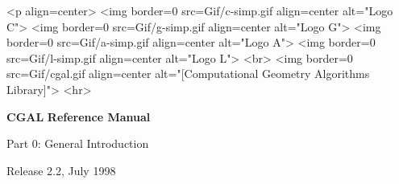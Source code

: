\documentclass{book}
\newcommand{\cgalColumnLayout}{\ccTexHtml{%
    \ccSetThreeColumns{Oriented_side}{}{\hspace*{8.5cm}}
    \ccPropagateThreeToTwoColumns}{}}
\newcommand{\cgalrelease}{2.2}
\begin{document}
\pagestyle{empty}

\begin{titlepage}
\mbox{}
\vskip3cm

\ccTexHtml
{\centerline{
    }}
 {<p align=center>
   <img border=0 src=Gif/c-simp.gif align=center alt="Logo C">
   <img border=0 src=Gif/g-simp.gif align=center alt="Logo G">
   <img border=0 src=Gif/a-simp.gif align=center alt="Logo A">
   <img border=0 src=Gif/l-simp.gif align=center alt="Logo L">
   <br>
   <img border=0 src=Gif/cgal.gif align=center
    alt="[Computational Geometry Algorithms Library]">
    <hr>}

\vskip2cm
\centerline{ {\Huge\bf CGAL} {\huge\bf Reference Manual } }
\vskip1cm
\centerline{ {\huge Part 0: General Introduction} }

\vskip2cm
\newcommand{\mydate}{July 1998}
\ccTexHtml
{\renewcommand{\mydate}{\ifcase\the\month \or January\or
    February\or March\or April\or May\or June\or July\or August\or
    September\or October\or November\or December\fi~\the\year}}{}
  \centerline{ {\large Release \cgalrelease, \mydate} }

\end{titlepage}

\pagestyle{plain}
\setcounter{page}{0}


\cleardoublepage
\tableofcontents

\cleardoublepage
{}
\setcounter{page}{1}

\cgalColumnLayout






%
%

\lcTex{\printindex}
\end{document}
